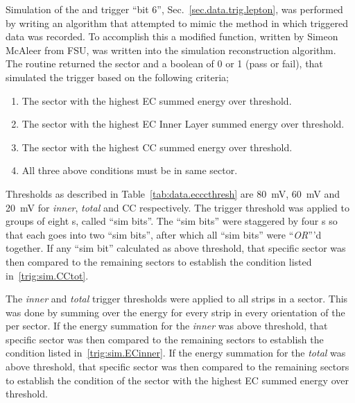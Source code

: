 Simulation of the  and  trigger ``bit 6'', Sec.~\ref{sec.data.trig.lepton}, was performed by writing an algorithm that attempted to mimic the method in which triggered data was recorded. To accomplish this a modified function, written by Simeon McAleer from FSU, was written into the simulation reconstruction algorithm. The routine returned the sector and a boolean of 0 or 1 (pass or fail), that simulated the trigger based on the following criteria;
\begin{enumerate}\label{trig:sim.all}
\item The sector with the highest EC summed energy over threshold. \label{trig:sim.ECtot} 
\item The sector with the highest EC Inner Layer summed energy over threshold. \label{trig:sim.ECinner} 
\item The sector with the highest CC summed energy over threshold. \label{trig:sim.CCtot} 
\item All three above conditions must be in same sector.
\end{enumerate}
Thresholds as described in Table~\ref{tab:data.ecccthresh} are 80~mV, 60~mV and 20~mV for  \emph{inner}, \emph{total} and CC respectively. The  trigger threshold was applied to groups of eight  s, called ``sim bits''. The ``sim bits'' were staggered by four s so that each  goes into two ``sim bits'', after which all ``sim bits'' were ``\emph{OR}'''d together. If any ``sim bit'' calculated as above threshold, that specific sector was then compared to the remaining sectors to establish the condition listed in~\ref{trig:sim.CCtot}.

The  \emph{inner} and  \emph{total} trigger thresholds were applied to all  strips in a sector. This was done by summing over the energy for every strip in every orientation of the  per sector. If the energy summation for the  \emph{inner} was above threshold,   that specific sector was then compared to the remaining sectors to establish the condition listed in~\ref{trig:sim.ECinner}. If the energy summation for the  \emph{total} was above threshold, that specific sector was then compared to the remaining sectors to establish the condition of the sector with the highest EC summed energy over threshold.

